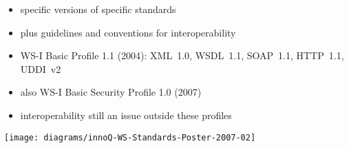 \documentclass{sepslide-soa-faked} %
\begin{document}
\begin{slide}
\begin{itemize}
\item specific versions of specific standards
\item plus guidelines and conventions for interoperability
\item WS-I Basic Profile 1.1 (2004): XML~1.0, WSDL~1.1, SOAP~1.1, HTTP~1.1, UDDI~v2
\begin{quote} \leavevmode
{}
\end{quote}
\item also WS-I Basic Security Profile 1.0 (2007)
\begin{quote} \leavevmode 
{}
\end{quote}
\item interoperability still an issue outside these profiles
\end{itemize}
\end{slide}

\begin{slide}
\texttt{[image: diagrams/innoQ-WS-Standards-Poster-2007-02]}
\end{slide}

\begin{slide}
  \Listofslides
\end{slide}

\begin{slide}
  \Timetable
\end{slide}
\end{document}
